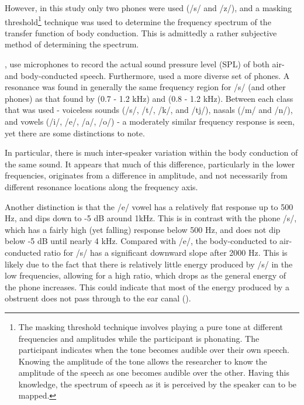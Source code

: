 However, in this study only two phones were used (/s/ and /z/), and a masking threshold\footnote{The masking threshold technique involves playing a pure tone at different frequencies and amplitudes while the participant is phonating. The participant indicates when the tone becomes audible over their own speech. Knowing the amplitude of the tone allows the researcher to know the amplitude of the speech as one becomes audible over the other. Having this knowledge, the spectrum of speech as it is perceived by the speaker can to be mapped.} technique was used to determine the frequency spectrum of the transfer function of body conduction.  This is admittedly a rather subjective method of determining the spectrum.  

\cite{reinfeldt:10}, use microphones to record the actual sound pressure level (SPL) of both air- and body-conducted speech. Furthermore, \cite{reinfeldt:10} used a more diverse set of phones.  A resonance was found in generally the same frequency region for /s/ (and other phones) as that found by \cite{porschmann:00} (0.7 - 1.2 kHz) and \cite{hakansson:94} (0.8 - 1.2 kHz). %
Between each class that was used - voiceless sounds (/s/, /t/, /k/, and /tj/),  nasals (/m/ and /n/), and vowels (/i/, /e/, /a/, /o/) - a moderately similar frequency response is seen, yet there are some distinctions to note. %

In particular, %
there is much inter-speaker variation within the body conduction of the same sound.  %
It appears that much of this difference, particularly in the lower frequencies, originates from a difference in amplitude, and not necessarily from different resonance locations along the frequency axis.  %

Another distinction is that the /e/ vowel has a relatively flat response up to 500 Hz, and dips down to -5 dB around 1kHz.  This is in contrast with the phone /s/, which has a fairly high (yet falling) response below 500 Hz, and does not dip below -5 dB until nearly 4 kHz.  Compared with /e/, the body-conducted to air-conducted ratio for /s/ has a significant downward slope after 2000 Hz.  This is likely due to the fact that there is relatively little energy produced by /s/ in the low frequencies, allowing for a high ratio, which drops as the general energy of the phone increases.  This could indicate that most of the energy produced by a obstruent does not pass through to the ear canal (\cite{reinfeldt:10}).

